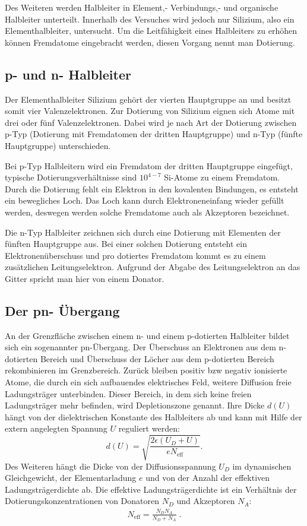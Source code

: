  Des Weiteren werden Halbleiter in Element,-
Verbindungs,- und organische Halbleiter unterteilt. Innerhalb des Versuches wird
jedoch nur Silizium, also ein Elementhalbleiter, untersucht. Um die Leitfähigkeit
eines Halbleiters zu erhöhen können Fremdatome eingebracht werden, diesen Vorgang nennt man
Dotierung.


\subsection{p- und n- Halbleiter}
Der Elementhalbleiter Silizium gehört der vierten Hauptgruppe an und besitzt somit
vier Valenzelektronen. Zur Dotierung von Silizium eignen sich Atome mit drei oder
fünf Valenzelektronen. Dabei wird je nach Art der Dotierung zwischen
p-Typ (Dotierung mit Fremdatomen der dritten Hauptgruppe) und n-Typ (fünfte Hauptgruppe)
unterschieden.

Bei p-Typ Halbleitern wird ein Fremdatom der dritten Hauptgruppe eingefügt,
typische Dotierungsverhältnisse sind $10^{4-7}$ Si-Atome zu einem Fremdatom.
Durch die Dotierung fehlt ein Elektron in den kovalenten Bindungen, es entsteht ein
bewegliches Loch. Das Loch kann durch Elektroneneinfang wieder gefüllt werden,
deswegen werden solche Fremdatome auch als Akzeptoren bezeichnet.

Die n-Typ Halbleiter zeichnen sich durch eine Dotierung mit Elementen der
fünften Hauptgruppe aus. Bei einer solchen Dotierung entsteht ein Elektronenüberschuss
und pro dotiertes Fremdatom kommt es zu einem zusätzlichen Leitungselektron. Aufgrund
der Abgabe des Leitungselektron an das Gitter spricht man hier von einem Donator.

\subsection{Der pn- Übergang}
An der Grenzfläche zwischen einem n- und einem p-dotierten Halbleiter bildet sich ein sogenannter pn-Übergang.
Der Überschuss an Elektronen aus dem n-dotierten Bereich und Überschuss der Löcher aus dem p-dotierten Bereich rekombinieren im Grenzbereich.
Zurück bleiben positiv bzw negativ ionisierte Atome, die durch ein sich aufbauendes elektrisches Feld, weitere Diffusion freie Ladungsträger unterbinden.
Dieser Bereich, in dem sich keine freien Ladungsträger mehr befinden, wird Depletionszone genannt. Ihre Dicke $d(U)$ hängt von der
dielektrischen Konstante des Halbleiters ab und kann mit
Hilfe der extern angelegten Spannung $U$ reguliert werden:
\begin{equation}
    \label{depl}
    d(U)=\sqrt{ \frac{ 2 \epsilon (U_D +U ) }{e N_\text{eff}}}.
\end{equation}
Des Weiteren hängt die Dicke von der Diffusionsspannung $U_D$ im dynamischen Gleichgewicht,
der Elementarladung $e$ und von der Anzahl der effektiven Ladungsträgerdichte ab. Die
effektive Ladungsträgerdichte ist ein Verhältnis der Dotierungskonzentrationen von
Donatoren $N_D$ und Akzeptoren $N_A$:
\begin{align}
	N_\text{eff}=\frac{N_D N_A}{N_D +N_A}\;.
\end{align}

